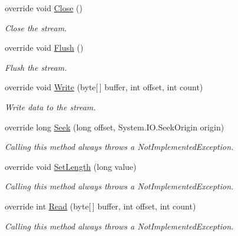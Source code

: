 \begin{DoxyCompactItemize}
override void \mbox{\hyperlink{class_super_tiled2_unity_1_1_ionic_1_1_b_zip2_1_1_b_zip2_output_stream_a7acf50ef5218727002461da44cf90842}{Close}} ()
\begin{DoxyCompactList}\small\item\em Close the stream. \end{DoxyCompactList}\item 
override void \mbox{\hyperlink{class_super_tiled2_unity_1_1_ionic_1_1_b_zip2_1_1_b_zip2_output_stream_a850903d1f3d56d1ba3d92aeec9f847b2}{Flush}} ()
\begin{DoxyCompactList}\small\item\em Flush the stream. \end{DoxyCompactList}\item 
override void \mbox{\hyperlink{class_super_tiled2_unity_1_1_ionic_1_1_b_zip2_1_1_b_zip2_output_stream_abc8d5682aa41b2c02dcf2b2b53187278}{Write}} (byte\mbox{[}$\,$\mbox{]} buffer, int offset, int count)
\begin{DoxyCompactList}\small\item\em Write data to the stream. \end{DoxyCompactList}\item 
override long \mbox{\hyperlink{class_super_tiled2_unity_1_1_ionic_1_1_b_zip2_1_1_b_zip2_output_stream_a1a72e3c36990988ad20de752bcb0db4b}{Seek}} (long offset, System.\+I\+O.\+Seek\+Origin origin)
\begin{DoxyCompactList}\small\item\em Calling this method always throws a Not\+Implemented\+Exception. \end{DoxyCompactList}\item 
override void \mbox{\hyperlink{class_super_tiled2_unity_1_1_ionic_1_1_b_zip2_1_1_b_zip2_output_stream_a6b1af6c443d87ecbd02d00051fe62a95}{Set\+Length}} (long value)
\begin{DoxyCompactList}\small\item\em Calling this method always throws a Not\+Implemented\+Exception. \end{DoxyCompactList}\item 
override int \mbox{\hyperlink{class_super_tiled2_unity_1_1_ionic_1_1_b_zip2_1_1_b_zip2_output_stream_aff101e2aeabe0a78fca105793463bf1e}{Read}} (byte\mbox{[}$\,$\mbox{]} buffer, int offset, int count)
\begin{DoxyCompactList}\small\item\em Calling this method always throws a Not\+Implemented\+Exception. \end{DoxyCompactList}\end{DoxyCompactItemize}
